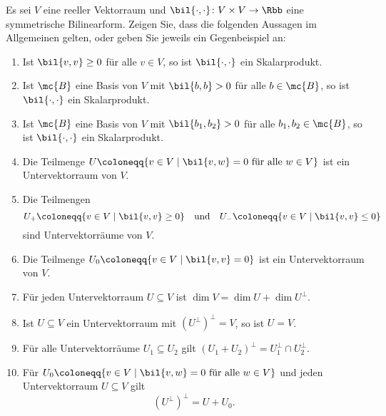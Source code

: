 \begin{question}
  Es sei $V$ eine reeller Vektorraum und $\bil{\cdot, \cdot} \colon V \times V \to \Rbb$ eine symmetrische Bilinearform.
  Zeigen Sie, dass die folgenden Aussagen im Allgemeinen gelten, oder geben Sie jeweils ein Gegenbeispiel an:
  \begin{enumerate}[leftmargin=*]
    \item
      Ist $\bil{v, v} \geq 0$ für alle $v \in V$, so ist $\bil{\cdot, \cdot}$ ein Skalarprodukt.
    \item
      Ist $\mc{B}$ eine Basis von $V$ mit $\bil{b, b} > 0$ für alle $b \in \mc{B}$, so ist $\bil{\cdot, \cdot}$ ein Skalarprodukt.
    \item
      Ist $\mc{B}$ eine Basis von $V$ mit $\bil{b_1, b_2} > 0$ für alle $b_1, b_2 \in \mc{B}$, so ist $\bil{\cdot, \cdot}$ ein Skalarprodukt.
    \item
      Die Teilmenge $U \coloneqq \{ v \in V \mid \text{$\bil{v, w} = 0$ für alle $w \in V$} \}$ ist ein Untervektorraum von $V$.
    \item
      Die Teilmengen
      \[
        U_+ \coloneqq \{ v \in V \mid \bil{v, v} \geq 0 \}
        \quad\text{und}\quad
        U_- \coloneqq \{ v \in V \mid \bil{v, v} \leq 0 \}
      \]
      sind Untervektorräume von $V$.
    \item
      Die Teilmenge $U_0 \coloneqq \{ v \in V \mid \bil{v, v} = 0 \}$ ist ein Untervektorraum von $V$.
    \item
      Für jeden Untervektorraum $U \subseteq V$ ist $\dim V = \dim U + \dim U^\perp$.
    \item
      Ist $U \subseteq V$ ein Untervektorraum mit $(U^\perp)^\perp = V$, so ist $U = V$.
    \item
      Für alle Untervektorräume $U_1 \subseteq U_2$ gilt $(U_1 + U_2)^\perp = U_1^\perp \cap U_2^\perp$.
    \item
      Für $U_0 \coloneqq \{ v \in V \mid \text{$\bil{v, w} = 0$ für alle $w \in V$} \}$ und jeden Untervektorraum $U \subseteq V$ gilt
      \[
        (U^\perp)^\perp = U + U_0.
      \]
  \end{enumerate}
\end{question}


